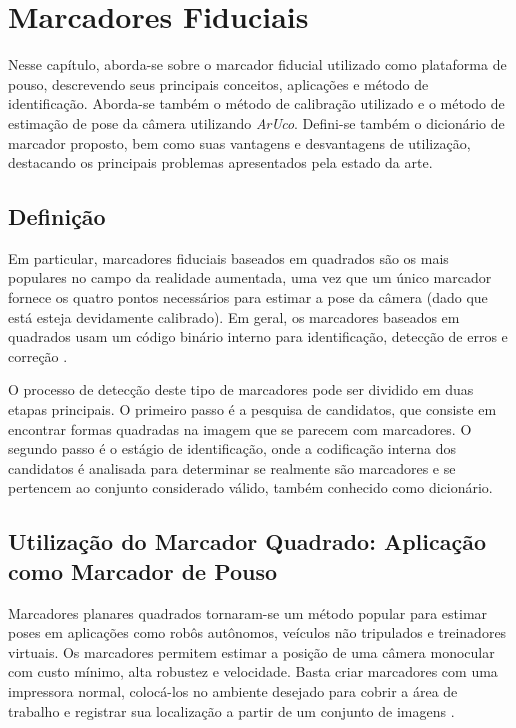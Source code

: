 \chapter{Marcadores Fiduciais}

    Nesse capítulo, aborda-se sobre o marcador fiducial utilizado como plataforma de pouso, descrevendo seus principais conceitos, aplicações e método de identificação. Aborda-se também o método de calibração utilizado e o método de estimação de pose da câmera utilizando \textit{ArUco}. Defini-se também o dicionário de marcador proposto, bem como suas vantagens e desvantagens de utilização, destacando os principais problemas apresentados pela estado da arte.

\section{Definição}

Em particular, marcadores fiduciais baseados em quadrados são os mais populares no campo da realidade aumentada, uma vez que um único marcador fornece os quatro pontos necessários para estimar a pose da câmera (dado que está esteja devidamente calibrado). Em geral, os marcadores baseados em quadrados usam um código binário interno para identificação, detecção de erros e correção \cite{Ramirez2018}.

O processo de detecção deste tipo de marcadores pode ser dividido em duas etapas principais. O primeiro passo é a pesquisa de candidatos, que consiste em encontrar formas quadradas na imagem que se parecem com marcadores. O segundo passo é o estágio de identificação, onde a codificação interna dos candidatos é analisada para determinar se realmente são marcadores e se pertencem ao conjunto considerado válido, também conhecido como dicionário.

\section{Utilização do Marcador Quadrado: Aplicação como Marcador de Pouso}

Marcadores planares quadrados tornaram-se um método popular para estimar poses em aplicações como robôs autônomos, veículos não tripulados e treinadores virtuais. Os marcadores permitem estimar a posição de uma câmera monocular com custo mínimo, alta robustez e velocidade. Basta criar marcadores com uma impressora normal, colocá-los no ambiente desejado para cobrir a área de trabalho e registrar sua localização a partir de um conjunto de imagens \cite{Ramirez2018}.

